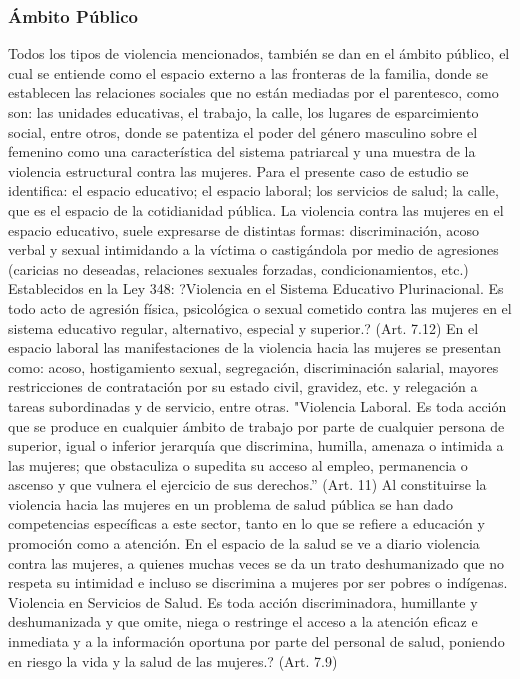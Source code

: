 \documentclass[11pt,letter]{article}
\begin{document}
\subsubsection{Ámbito Público}
Todos los tipos de violencia mencionados, también se dan en el ámbito público, el cual se entiende como el espacio externo a las fronteras de la familia, donde se establecen las relaciones sociales que no están mediadas
por el parentesco, como son: las unidades educativas, el trabajo, la calle, los lugares de esparcimiento social, entre otros, donde se patentiza el poder del género masculino sobre el femenino como una característica del sistema
patriarcal y una muestra de la violencia estructural contra las mujeres.
Para el presente caso de estudio se identifica: el espacio educativo; el espacio laboral; los servicios de salud; la calle, que es el espacio de la cotidianidad pública. 
La violencia contra las mujeres en el espacio educativo, suele expresarse de distintas formas: discriminación, acoso verbal y sexual intimidando a la víctima o castigándola por medio de agresiones (caricias no deseadas, relaciones sexuales forzadas, condicionamientos, etc.) Establecidos
en la Ley 348:
?Violencia en el Sistema Educativo Plurinacional. Es todo acto de agresión física, psicológica o sexual cometido contra las mujeres en el sistema educativo regular, alternativo, especial y superior.? (Art. 7.12)
En el espacio laboral las manifestaciones de la violencia hacia las mujeres se presentan como: acoso, hostigamiento sexual, segregación, discriminación salarial, mayores restricciones de contratación por su estado civil, gravidez, etc. y relegación a tareas subordinadas y de servicio, entre
otras. "Violencia Laboral. Es toda acción que se produce en cualquier ámbito de trabajo por parte de cualquier persona de superior, igual o inferior jerarquía que discrimina, humilla, amenaza o intimida a las mujeres;
que obstaculiza o supedita su acceso al empleo, permanencia o ascenso y que vulnera el ejercicio de sus derechos.'' (Art. 11)
Al constituirse la violencia hacia las mujeres en un problema de salud pública se han dado competencias específicas a este sector, tanto en lo que se refiere a educación y promoción como a atención. En el espacio de la salud se ve a diario violencia contra las mujeres, a quienes muchas veces se da un trato deshumanizado que no respeta su intimidad e incluso se discrimina a mujeres por ser pobres o indígenas.
Violencia en Servicios de Salud. Es toda acción discriminadora, humillante y deshumanizada y que omite, niega o restringe el acceso a la atención eficaz e inmediata y a la información oportuna por parte del personal de salud, poniendo en riesgo la vida y la salud de las mujeres.? (Art. 7.9)
\end{document}
